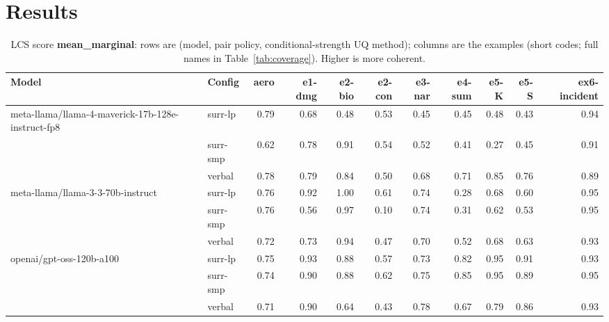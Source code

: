 \documentclass[11pt]{article}
\begin{document}
\section{Results}

\begin{table}[htbp]
\centering
\footnotesize
\setlength{\tabcolsep}{3.5pt}
\caption{LCS score \textbf{mean\_marginal}: rows are (model, pair policy, conditional-strength UQ method); columns are the examples (short codes; full names in Table~\ref{tab:coverage}). Higher is more coherent.}
\label{tab:mean-marginal}
\begin{tabular}{llrrrrrrrrr}
\toprule
\textbf{Model} & \textbf{Config} & \textbf{aero} & \textbf{e1-dmg} & \textbf{e2-bio} & \textbf{e2-con} & \textbf{e3-nar} & \textbf{e4-sum} & \textbf{e5-K} & \textbf{e5-S} & \textbf{ex6-incident} \\
\midrule
meta-llama/llama-4-maverick-17b-128e-instruct-fp8 & surr-lp & 0.79 & 0.68 & 0.48 & 0.53 & 0.45 & 0.45 & 0.48 & 0.43 & 0.94 \\
 & surr-smp & 0.62 & 0.78 & 0.91 & 0.54 & 0.52 & 0.41 & 0.27 & 0.45 & 0.91 \\
 & verbal & 0.78 & 0.79 & 0.84 & 0.50 & 0.68 & 0.71 & 0.85 & 0.76 & 0.89 \\
\midrule
meta-llama/llama-3-3-70b-instruct & surr-lp & 0.76 & 0.92 & 1.00 & 0.61 & 0.74 & 0.28 & 0.68 & 0.60 & 0.95 \\
 & surr-smp & 0.76 & 0.56 & 0.97 & 0.10 & 0.74 & 0.31 & 0.62 & 0.53 & 0.95 \\
 & verbal & 0.72 & 0.73 & 0.94 & 0.47 & 0.70 & 0.52 & 0.68 & 0.63 & 0.93 \\
\midrule
openai/gpt-oss-120b-a100 & surr-lp & 0.75 & 0.93 & 0.88 & 0.57 & 0.73 & 0.82 & 0.95 & 0.91 & 0.93 \\
 & surr-smp & 0.74 & 0.90 & 0.88 & 0.62 & 0.75 & 0.85 & 0.95 & 0.89 & 0.95 \\
 & verbal & 0.71 & 0.90 & 0.64 & 0.43 & 0.78 & 0.67 & 0.79 & 0.86 & 0.93 \\
\bottomrule
\end{tabular}
\end{table}
\end{document}
